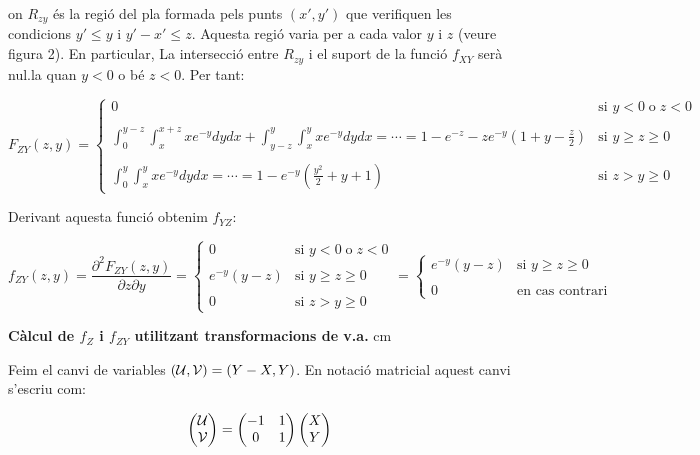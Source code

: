 \documentclass{article}
\begin{document}
on $R_{zy}$ \'es la regi\'o del pla formada pels punts $(x', y')$ que verifiquen les condicions  $y' \leq y$ i 
$y'-x' \leq z$. Aquesta regi\'o varia per a cada valor $y$ i $z$ (veure figura 2).
En particular, La intersecci\'o entre $R_{zy}$ i el suport de la funci\'o $f_{XY}$ ser\`a nul.la quan
$y < 0$ o b\'e $z < 0$. Per tant:

\[
F_{ZY}(z, y)=\begin{cases} 
0 & \text{si } y < 0 \; \text{o} \; z < 0 \\ \\
\int_0^{y-z} \int_x^{x+z} x e^{-y} dy dx + \int_{y-z}^y \int_x^y x e^{-y} dy dx = \cdots = 
1-e^{-z}-ze^{-y}(1+y-\frac{z}{2}) & \text{si } y \geq z \geq 0 \\ \\
\int_0^y \int_x^y xe^{-y} dy dx = \cdots = 1 - e^{-y} (\frac{y^2}{2}+y+1) & \text{si } z > y \geq 0
\end{cases}
\]

Derivant aquesta funci\'o obtenim $f_{YZ}$:

\[
f_{ZY}(z, y)=\frac{\partial^2 F_{ZY}(z, y)}{\partial z \partial y}=
\begin{cases} 
0 & \text{si } y < 0 \; \text{o} \; z < 0 \\ \\
e^{-y} (y-z) & \text{si } y \geq z \geq 0 \\ \\
0 & \text{si } z > y \geq 0
\end{cases} = 
\begin{cases} e^{-y} (y-z) & \text{si } y \geq z \geq 0 \\ \\ 0 & \text{en cas contrari} \end{cases}
\]


\newpage
\noindent
\textbf{C\`alcul de $f_Z$ i $f_{ZY}$ utilitzant transformacions de v.a.}
 cm

Feim el canvi de variables $({\cal U},{\cal V}) = (Y - X, Y)$. En notaci\'o matricial aquest canvi s'escriu
com:

\[
\begin{pmatrix} {\cal U} \\ {\cal V} \end{pmatrix} = \begin{pmatrix} -1 & 1 \\ 0 & 1 \end{pmatrix} 
\begin{pmatrix} X \\ Y \end{pmatrix}
\]
\end{document}
